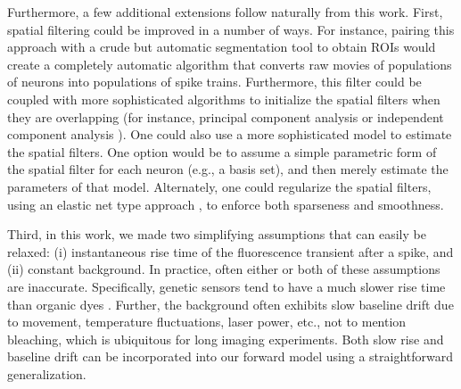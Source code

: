 
Furthermore, a few additional extensions follow naturally from this work.  First, spatial filtering could be improved in a number of ways.  For instance, pairing this approach with a crude but automatic segmentation tool to obtain ROIs would create a completely automatic algorithm that converts raw movies of populations of neurons into populations of spike trains.  Furthermore, this filter could be coupled with more sophisticated algorithms to initialize the spatial filters when they are overlapping (for instance, principal component analysis \cite{HornJohnson90} or independent component analysis \cite{MukamelSchnitzer09}). One could also use a more sophisticated model to estimate the spatial filters.  One option would be to assume a simple parametric form of the spatial filter for each neuron (e.g., a basis set), and then merely estimate the parameters of that model.  Alternately, one could regularize the spatial filters, using an elastic net type approach \cite{ZouHastie05,GrosenickSmith09}, to enforce both sparseness and smoothness.



Third, in this work, we made two simplifying assumptions that can easily be relaxed: (i) instantaneous rise time of the fluorescence transient after a spike, and (ii) constant background.  In practice, often either or both of these assumptions are inaccurate.  Specifically, genetic sensors tend to have a much slower rise time than organic dyes \cite{ReiffBorst05}.  Further, the background often exhibits slow baseline drift due to movement, temperature fluctuations, laser power, etc., not to mention bleaching, which is ubiquitous for long imaging experiments.  Both slow rise and baseline drift can be incorporated into our forward model using a straightforward generalization. 

